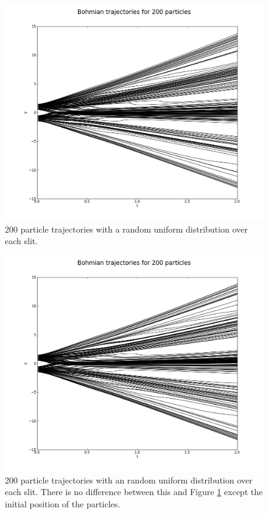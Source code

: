 \documentclass[10pt, reqno]{article}
\begin{document}
  \begin{figure}[!ht]
    \centerline{\includegraphics[scale=.3]{./imgs/200-bohmian-trajectories-85e4ecb6df758e2b.png}}
    \caption{
      200 particle trajectories with a random uniform distribution over each slit.
    }
    \label{fig:trajsym}
  \end{figure}

  \begin{figure}[!ht]
    \centerline{\includegraphics[scale=.3]{./imgs/200-bohmian-trajectories-3506320ca33960b0.png}}
    \caption{
      200 particle trajectories with an random uniform distribution over each slit. 
      There is no difference between this and Figure \ref{fig:trajsym} except the initial position of the particles.
    }
    \label{fig:trajnonsym}
  \end{figure}
\end{document}
